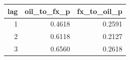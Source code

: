 \begin{tabular}{rrr}
\toprule
lag & oil\_to\_fx\_p & fx\_to\_oil\_p \\
\midrule
1 & 0.4618 & 0.2591 \\
2 & 0.6118 & 0.2127 \\
3 & 0.6560 & 0.2618 \\
\bottomrule
\end{tabular}
